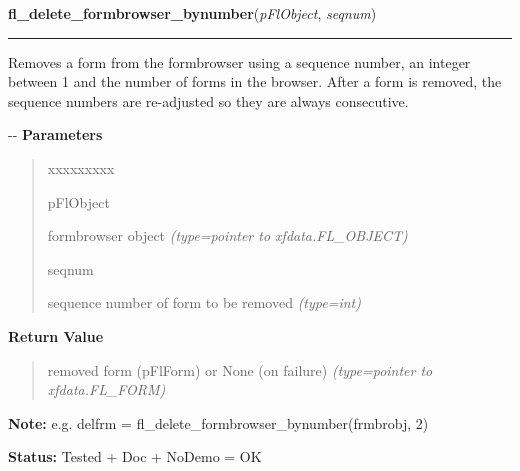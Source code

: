     \label{xformslib:flformbrowser:fl_delete_formbrowser_bynumber}

    \vspace{0.5ex}

\hspace{.8\funcindent}\begin{boxedminipage}{\funcwidth}

    \raggedright \textbf{fl\_delete\_formbrowser\_bynumber}(\textit{pFlObject}, \textit{seqnum})

    \vspace{-1.5ex}

    \rule{\textwidth}{0.5\fboxrule}
\setlength{\parskip}{2ex}

Removes a form from the formbrowser using a sequence number, an
integer between 1 and the number of forms in the browser. After a
form is removed, the sequence numbers are re-adjusted so they are
always consecutive.

-{}-
\setlength{\parskip}{1ex}
      \textbf{Parameters}
      \vspace{-1ex}

      \begin{quote}
        \begin{Ventry}{xxxxxxxxx}

          \item[pFlObject]


formbrowser object
            {\it (type=pointer to xfdata.FL\_OBJECT)}

          \item[seqnum]


sequence number of form to be removed
            {\it (type=int)}

        \end{Ventry}

      \end{quote}

      \textbf{Return Value}
    \vspace{-1ex}

      \begin{quote}

removed form (pFlForm) or None (on failure)
      {\it (type=pointer to xfdata.FL\_FORM)}

      \end{quote}

\textbf{Note:} 
e.g. delfrm = fl\_delete\_formbrowser\_bynumber(frmbrobj, 2)


\textbf{Status:} 
Tested + Doc + NoDemo = OK


    \end{boxedminipage}

